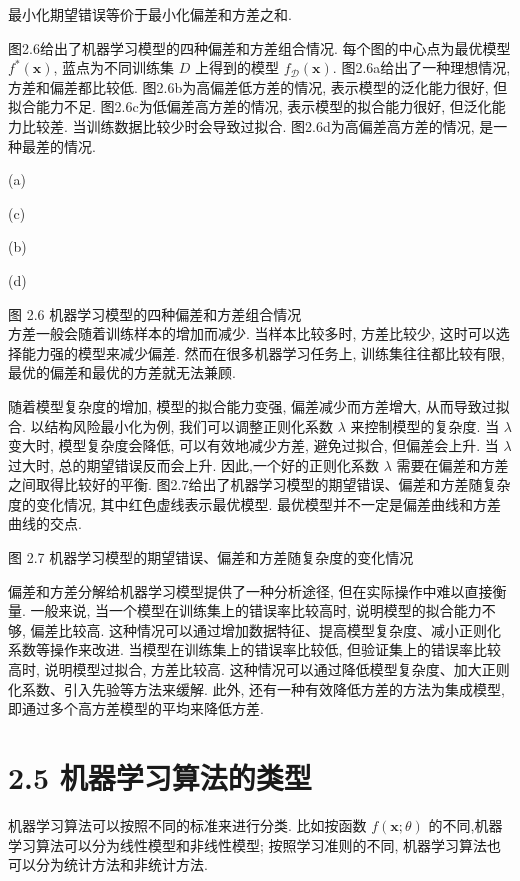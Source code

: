 \documentclass[10pt]{article}
\begin{document}
最小化期望错误等价于最小化偏差和方差之和.

图2.6给出了机器学习模型的四种偏差和方差组合情况. 每个图的中心点为最优模型 $f^{*}(\boldsymbol{x})$, 蓝点为不同训练集 $D$ 上得到的模型 $f_{\mathcal{D}}(\boldsymbol{x})$. 图2.6a给出了一种理想情况, 方差和偏差都比较低. 图2.6b为高偏差低方差的情况, 表示模型的泛化能力很好, 但拟合能力不足. 图2.6c为低偏差高方差的情况, 表示模型的拟合能力很好, 但泛化能力比较差. 当训练数据比较少时会导致过拟合. 图2.6d为高偏差高方差的情况, 是一种最差的情况.



(a)



(c)



(b)



(d)

图 2.6 机器学习模型的四种偏差和方差组合情况\\
方差一般会随着训练样本的增加而减少. 当样本比较多时, 方差比较少, 这时可以选择能力强的模型来减少偏差. 然而在很多机器学习任务上, 训练集往往都比较有限,最优的偏差和最优的方差就无法兼顾.

随着模型复杂度的增加, 模型的拟合能力变强, 偏差减少而方差增大, 从而导致过拟合. 以结构风险最小化为例, 我们可以调整正则化系数 $\lambda$ 来控制模型的复杂度. 当 $\lambda$ 变大时, 模型复杂度会降低, 可以有效地减少方差, 避免过拟合, 但偏差会上升. 当 $\lambda$ 过大时, 总的期望错误反而会上升. 因此,一个好的正则化系数 $\lambda$ 需要在偏差和方差之间取得比较好的平衡. 图2.7给出了机器学习模型的期望错误、偏差和方差随复杂度的变化情况, 其中红色虚线表示最优模型. 最优模型并不一定是偏差曲线和方差曲线的交点.



图 2.7 机器学习模型的期望错误、偏差和方差随复杂度的变化情况

偏差和方差分解给机器学习模型提供了一种分析途径, 但在实际操作中难以直接衡量. 一般来说, 当一个模型在训练集上的错误率比较高时, 说明模型的拟合能力不够, 偏差比较高. 这种情况可以通过增加数据特征、提高模型复杂度、减小正则化系数等操作来改进. 当模型在训练集上的错误率比较低, 但验证集上的错误率比较高时, 说明模型过拟合, 方差比较高. 这种情况可以通过降低模型复杂度、加大正则化系数、引入先验等方法来缓解. 此外, 还有一种有效降低方差的方法为集成模型, 即通过多个高方差模型的平均来降低方差.

\section*{2.5 机器学习算法的类型}
机器学习算法可以按照不同的标准来进行分类. 比如按函数 $f(\boldsymbol{x} ; \theta)$ 的不同,机器学习算法可以分为线性模型和非线性模型; 按照学习准则的不同, 机器学习算法也可以分为统计方法和非统计方法.
\end{document}
